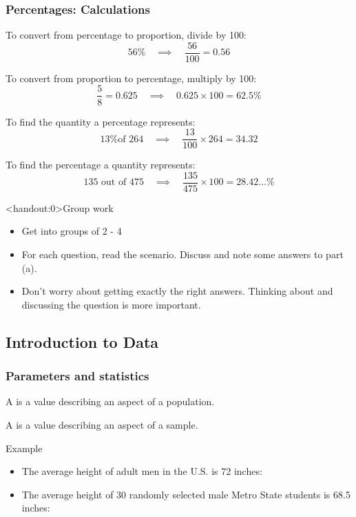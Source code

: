 \documentclass[xcolor=table, aspectratio=169, bigger]{beamer}
\begin{document}
\begin{frame}
\frametitle{Percentages: Calculations}
\begin{exampleblock}{}
To convert from percentage to proportion, divide by 100:
\[56\% \quad \implies \quad \frac {56}{100} = 0.56\]

To convert from proportion to percentage, multiply by 100:
\[\frac 5 8 = 0.625 \quad \implies \quad 0.625 \times 100 = 62.5\%\]

To find the quantity a percentage represents:
\[\text{13\% of 264}\quad \implies \quad \frac {13}{100} \times 264 = 34.32\]

To find the percentage a quantity represents:
\[\text{135 out of 475} \quad \implies \quad \frac {135}{475} \times 100 = 28.42\ldots \%\]
\end{exampleblock}
\end{frame}

\begin{frame}<handout:0>{Group work}
\begin{block}{}

\begin{itemize}
\item Get into groups of 2 - 4
\item For each question, read the scenario. Discuss and note some answers to part (a).
\item Don't worry about getting exactly the right answers. Thinking about and discussing the question is more important.
\end{itemize}
\end{block}
\end{frame}


%
%
\subsection{Introduction to Data}

\begin{frame}
\frametitle{Parameters and statistics}

\begin{block}{}
A  is a value describing an aspect of a population.
\end{block}
\pause
\begin{block}{}
A  is a value describing an aspect of a sample.
\end{block}
\pause
\begin{exampleblock}{Example}
\begin{itemize}
\item The average height of adult men in the U.S. is 72 inches: 

\item The average height of 30 randomly selected male Metro State students is 68.5 inches: 
\end{itemize}
\end{exampleblock}

\end{frame}
\end{document}
